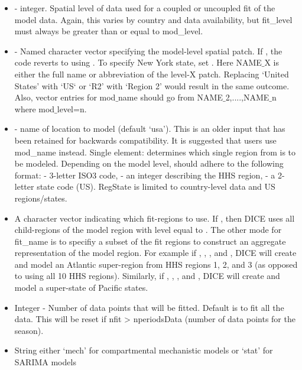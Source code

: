 \documentclass[a4paper]{article}
\begin{document}
\begin{itemize}
\item {} - integer. Spatial level of data used for a coupled or uncoupled fit of the model data.  Again, this varies by country and data availability, but fit\_level must always be greater than or equal to mod\_level.
  \item {} - Named character vector specifying the model-level spatial patch.  If , the code reverts to using .  To specify New York state, set . Here NAME$\_$X is either the full name or abbreviation of the level-X patch. Replacing `United States' with `US` or `R2' with `Region 2' would result in the same outcome.  Also, vector entries for mod$\_$name should go from NAME$\_$2,....,NAME$\_$n where mod$\_$level=n.
\item {} - name of location to model (default `usa').  This is an older input that has been retained for backwards compatibility.  It is suggested that users use mod\_name instead.  Single element: determines which single region from  is to be modeled. Depending on the model level,  should adhere to the following format:  - 3-letter ISO3 code,  - an integer describing the HHS region,  - a 2-letter state code (US). RegState is limited to country-level data and US regions/states.
\item {} A character vector indicating which fit-regions to use.  If , then DICE uses all child-regions of the model region with level equal to . The other mode for fit\_name is to specifiy a subset of the fit regions to construct an aggregate representation of the model region.  For example if , , , and , DICE will create and model an Atlantic super-region from HHS regions 1, 2, and 3 (as opposed to using all 10 HHS regions).  Similarly, if , , , and , DICE will create and model a super-state of Pacific states.
\item {} Integer - Number of data points that will be fitted.  Default is to fit all the data.  This will be reset if nfit > nperiodsData (number of data points for the season).
\item {} String either `mech' for compartmental mechanistic models or `stat' for SARIMA models

\end{itemize}
\end{document}
